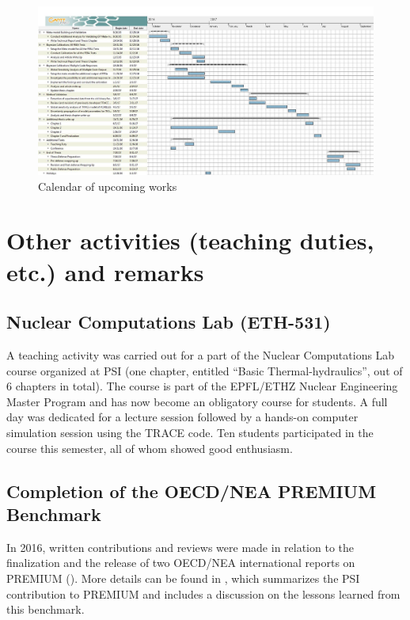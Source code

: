 \documentclass[11pt,titlepage]{article}
\begin{document}
\begin{figure}
	\includegraphics[scale=0.85]{figures/gantt.png}
	\caption{Calendar of upcoming works}
	\label{fig:gantt}
\end{figure}


\section{Other activities (teaching duties, etc.) and remarks}

\subsection{Nuclear Computations Lab (ETH-531)}

A teaching activity was carried out for a part of the Nuclear Computations Lab 
course organized at PSI (one chapter, entitled ``Basic Thermal-hydraulics'', out of 
6 chapters in total). 
The course is part of the EPFL/ETHZ Nuclear Engineering Master Program and has 
now become an obligatory course for students.
A full day was dedicated for a lecture session followed by a hands-on computer
simulation session using the TRACE code.
Ten students participated in the course this semester, all of whom showed good 
enthusiasm.

\subsection{Completion of the OECD/NEA PREMIUM Benchmark}

In 2016, written contributions and reviews were made in relation to the finalization and the release of two OECD/NEA international reports 
on PREMIUM (\cite{Reventos2016, Sanz2016}). 
More details can be found in \cite{Wicaksono2016b}, 
which summarizes the PSI contribution to PREMIUM 
and includes a discussion on the lessons learned from this benchmark.
\end{document}
